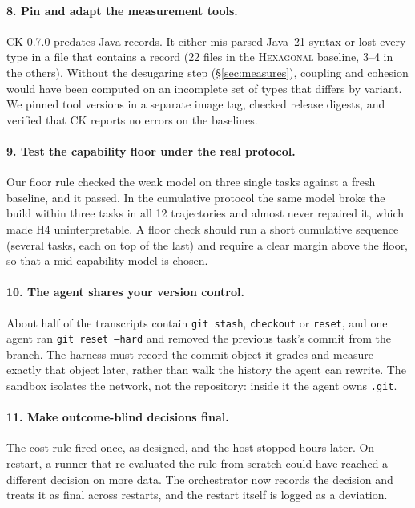 \documentclass[10pt]{article}
\newcommand{\HEX}{\textsc{Hexagonal}}
\newcommand{\code}[1]{\texttt{#1}}
\begin{document}
\paragraph{8. Pin and adapt the measurement tools.} CK 0.7.0 predates Java records. It either mis-parsed
Java~21 syntax or lost every type in a file that contains a record (22 files in the \HEX{}
baseline, 3--4 in the others). Without the desugaring step (\S\ref{sec:measures}), coupling and
cohesion would have been computed on an incomplete set of types that differs by variant. We pinned tool versions in a separate image tag, checked release
digests, and verified that CK reports no errors on the baselines.

\paragraph{9. Test the capability floor under the real protocol.} Our floor rule checked the weak
model on three single tasks against a fresh baseline, and it passed. In the cumulative protocol the
same model broke the build within three tasks in all 12 trajectories and almost never repaired it,
which made H4 uninterpretable. A floor check should run
a short cumulative sequence (several tasks, each on top of the last) and require a clear margin
above the floor, so that a mid-capability model is chosen.

\paragraph{10. The agent shares your version control.} About half of the transcripts contain
\code{git stash}, \code{checkout} or \code{reset}, and one agent ran \code{git reset --hard} and
removed the previous task's commit from the branch. The harness must record the commit object it
grades and measure exactly that object later, rather than walk the history the agent can rewrite.
The sandbox isolates the network, not the repository: inside it the agent owns \code{.git}.

\paragraph{11. Make outcome-blind decisions final.} The cost rule fired once, as designed, and the
host stopped hours later. On restart, a runner that re-evaluated the rule from scratch could have
reached a different decision on more data. The orchestrator now records the decision and treats it
as final across restarts, and the restart itself is logged as a deviation.
\end{document}
